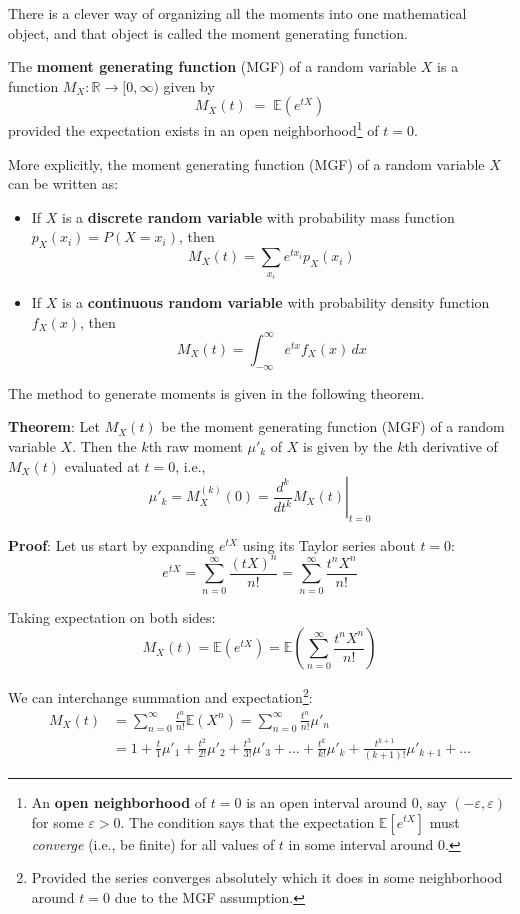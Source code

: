 \documentclass[twoside]{book}
\begin{document}
There is a
clever way of organizing all the moments into one
mathematical object, and that object is called the
moment generating function.
\begin{textbox}
The \textbf{moment generating function} (MGF) of a random variable $X$ is a function $M_X:\mathbb{R} \to [0, \infty)$ given by
    \[
      M_X(t) \;=\; \mathbb{E}\left( e^{tX} \right)
    \]
provided the expectation exists in an open neighborhood\footnote{An \textbf{open neighborhood} of \( t = 0 \) is an open interval around 0, say \( (-\varepsilon, \varepsilon) \) for some \( \varepsilon > 0 \). The condition says that the expectation \( \mathbb{E}[e^{tX}] \) must \emph{converge} (i.e., be finite) for all values of \( t \) in some interval around 0.} of $t=0$.
\end{textbox}

More explicitly, the moment generating function (MGF) of a random variable \(X\) can be written as:

\begin{itemize}
    \item If \(X\) is a \textbf{discrete random variable} with probability mass function \(p_X(x_i)=P(X=x_i)\), then
    \[
    M_X(t) = \sum_{x_i} e^{tx_i} p_X(x_i)
    \]
    \item If \(X\) is a \textbf{continuous random variable} with probability density function \(f_X(x)\), then
    \[
    M_X(t) = \int_{-\infty}^{\infty} e^{tx} f_X(x) \, dx
    \]
\end{itemize}

The method to generate moments is given in the following theorem.

\begin{textbox}
\textbf{Theorem}: Let \( M_X(t) \) be the moment generating function (MGF) of a random variable \( X \). Then the \( k \)th raw moment \( \mu'_k \) of \( X \) is given by the \( k \)th derivative of \( M_X(t) \) evaluated at \( t = 0 \), i.e.,
\[
\mu'_k = M_X^{(k)}(0) = \left. \frac{d^k}{dt^k} M_X(t) \right|_{t=0}
\]
\end{textbox}

\textbf{Proof}: Let us start by expanding \( e^{tX} \) using its Taylor series about \( t = 0 \):
\[
e^{tX} = \sum_{n=0}^{\infty} \frac{(tX)^n}{n!} = \sum_{n=0}^{\infty} \frac{t^n X^n}{n!}
\]

Taking expectation on both sides:
\[
M_X(t) = \mathbb{E}\left( e^{tX}\right)  = \mathbb{E} \left(  \sum_{n=0}^{\infty} \frac{t^n X^n}{n!} \right)
\]

We can interchange summation and expectation\footnote{Provided the series converges absolutely which it does in some neighborhood around \( t = 0 \) due to the MGF assumption.}:
\begin{align*}
    M_X(t) &= \sum_{n=0}^{\infty} \frac{t^n}{n!} \mathbb{E}(X^n)  = \sum_{n=0}^{\infty} \frac{t^n}{n!} \mu'_n\\
&=1+ \frac{t}{1}\mu'_1 + \frac{t^2}{2!}\mu'_2+ \frac{t^3}{3!}\mu'_3 + \dots + \frac{t^k}{k!}\mu'_k +\frac{t^{k+1}}{(k+1)!}\mu'_{k+1} + \dots
\end{align*}
\end{document}

